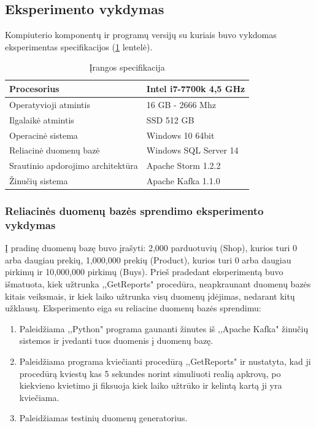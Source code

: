 \documentclass{VUMIFPSkursinis}
\begin{document}
\subsection{Eksperimento vykdymas}
Kompiuterio komponentų ir programų versijų su kuriais buvo vykdomas eksperimentas specifikacijos (\ref{table:hardware} lentelė).
\begin{table}[!htbp]
    \begin{center}
        \caption{Įrangos specifikacija}
        \label{table:hardware}
        \begin{tabular}{ | l | l |  } 
            \hline
            Procesorius & Intel i7-7700k 4,5 GHz \\* \hline
            Operatyvioji atmintis & 16 GB - 2666 Mhz \\* \hline
            Ilgalaikė atmintis & SSD 512 GB \\* \hline
            Operacinė sistema & Windows 10 64bit \\* \hline
            Reliacinė duomenų bazė & Windows SQL Server 14 \\* \hline
            Srautinio apdorojimo architektūra & Apache Storm 1.2.2 \\* \hline
            Žinučių sistema & Apache Kafka 1.1.0 \\* \hline
        \end{tabular}
    \end{center}
\end{table}\par

\subsubsection{Reliacinės duomenų bazės sprendimo eksperimento vykdymas}
Į pradinę duomenų bazę buvo įrašyti: 2,000 parduotuvių (Shop), kurios turi 0 arba daugiau prekių, 1,000,000 prekių (Product), kurios turi 0 arba daugiau pirkimų ir 10,000,000 pirkimų (Buys).
Prieš pradedant eksperimentą buvo išmatuota, kiek užtrunka ,,GetReports" procedūra, neapkraunant duomenų bazės kitais veiksmais, ir kiek laiko užtrunka visų duomenų įdėjimas,
nedarant kitų užklausų. 
Eksperimento eiga su reliacine duomenų bazės sprendimu:
\begin{enumerate} 
\item Paleidžiama ,,Python" programa gaunanti žinutes iš ,,Apache Kafka" žinučių sistemos ir įvedanti tuos duomenis į duomenų bazę. 
\item Paleidžiama programa kviečianti procedūrą ,,GetReports" ir nustatyta, kad ji procedūrą kviestų kas 5 sekundes norint simuliuoti realią apkrovą,
po kiekvieno kvietimo ji fiksuoja kiek laiko užtrūko ir kelintą kartą ji yra kviečiama. 
\item Paleidžiamas testinių duomenų generatorius.
\end{enumerate}
\end{document}
